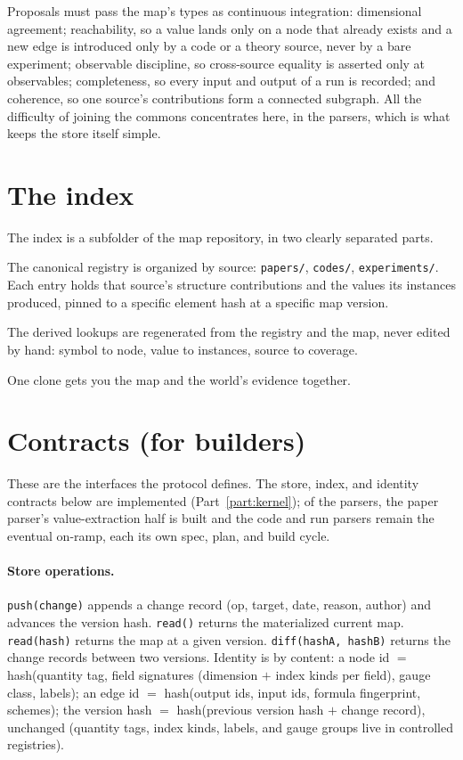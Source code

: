 \documentclass[11pt,a4paper]{article}
\begin{document}
Proposals must pass the map's types as continuous integration: dimensional
agreement; reachability, so a value lands only on a node that already exists and
a new edge is introduced only by a code or a theory source, never by a bare
experiment; observable discipline, so cross-source equality is asserted only at
observables; completeness, so every input and output of a run is recorded; and
coherence, so one source's contributions form a connected subgraph. All the
difficulty of joining the commons concentrates here, in the parsers, which is
what keeps the store itself simple.

\section{The index}

The index is a subfolder of the map repository, in two clearly separated parts.

The canonical registry is organized by source: \texttt{papers/}, \texttt{codes/},
\texttt{experiments/}. Each entry holds that source's structure contributions and the
values its instances produced, pinned to a specific element hash at a specific
map version.

The derived lookups are regenerated from the registry and the map, never edited
by hand: symbol to node, value to instances, source to coverage.

One clone gets you the map and the world's evidence together.

\section{Contracts (for builders)}

These are the interfaces the protocol defines. The store, index, and identity
contracts below are implemented (Part~\ref{part:kernel}); of the parsers, the
paper parser's value-extraction half is built and the code and run parsers remain
the eventual on-ramp, each its own spec, plan, and build cycle.

\paragraph{Store operations.} \texttt{push(change)} appends a change record (op, target, date,
reason, author) and advances the version hash. \texttt{read()} returns the
materialized current map. \texttt{read(hash)} returns the map at a given version.
\texttt{diff(hashA, hashB)} returns the change records between two versions. Identity
is by content: a node id $=$ hash(quantity tag, field signatures (dimension $+$
index kinds per field), gauge class, labels); an edge id $=$ hash(output ids,
input ids, formula fingerprint, schemes); the version hash $=$ hash(previous
version hash $+$ change record), unchanged (quantity tags, index kinds, labels,
and gauge groups live in controlled registries).
\end{document}
